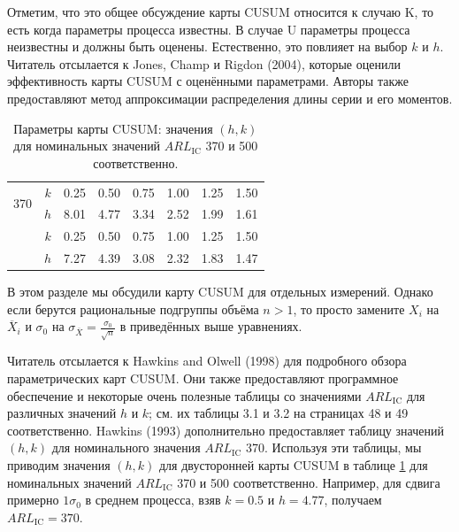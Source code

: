 Отметим, что это общее обсуждение карты CUSUM относится к случаю K, то есть когда параметры процесса известны. В случае U параметры процесса неизвестны и должны быть оценены. Естественно, это повлияет на выбор \(k\) и \(h\). Читатель отсылается к Jones, Champ и Rigdon (2004), которые оценили эффективность карты CUSUM с оценёнными параметрами. Авторы также предоставляют метод аппроксимации распределения длины серии и его моментов.

\begin{table}[htbp]
	\centering
	\caption{Параметры карты CUSUM: значения \((h, k)\) для номинальных значений \(ARL_{\text{IC}}\) 370 и 500 соответственно.}
	\label{tab:3.1}
	\renewcommand{\arraystretch}{1.2} %
	\begin{tabular}{c c *{6}{r}}
		\toprule
		\multirow{2}{*}{370} & \(k\) & 0.25 & 0.50 & 0.75 & 1.00 & 1.25 & 1.50 \\
		& \(h\) & 8.01 & 4.77 & 3.34 & 2.52 & 1.99 & 1.61 \\
		\addlinespace %
		\multirow{2}{*}{500} & \(k\) & 0.25 & 0.50 & 0.75 & 1.00 & 1.25 & 1.50 \\
		& \(h\) & 7.27 & 4.39 & 3.08 & 2.32 & 1.83 & 1.47 \\
		\bottomrule
	\end{tabular}
	\end{table}

В этом разделе мы обсудили карту CUSUM для отдельных измерений. Однако если берутся рациональные подгруппы объёма \(n > 1\), то просто замените \(X_i\) на \(\overline{X}_i\) и \(\sigma_0\) на \(\sigma_{\overline{X}} = \frac{\sigma_0}{\sqrt{n}}\) в приведённых выше уравнениях.

Читатель отсылается к Hawkins and Olwell (1998) для подробного обзора параметрических карт CUSUM. Они также предоставляют программное обеспечение и некоторые очень полезные таблицы со значениями \(ARL_{\text{IC}}\) для различных значений \(h\) и \(k\); см. их таблицы 3.1 и 3.2 на страницах 48 и 49 соответственно. Hawkins (1993) дополнительно предоставляет таблицу значений \((h, k)\) для номинального значения \(ARL_{\text{IC}}\) 370. Используя эти таблицы, мы приводим значения \((h, k)\) для двусторонней карты CUSUM в таблице \ref{tab:3.1} для номинальных значений \(ARL_{\text{IC}}\) 370 и 500 соответственно. Например, для сдвига примерно \(1\sigma_0\) в среднем процесса, взяв \(k = 0.5\) и \(h = 4.77\), получаем \(ARL_{\text{IC}} = 370\).

